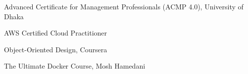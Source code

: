%
%
%



\begin{scholarship}

        {Advanced Certificate for Management Professionals (ACMP 4.0), University of Dhaka}

        {AWS Certified Cloud Practitioner}

        {Object-Oriented Design, Coursera}

        {The Ultimate Docker Course, Mosh Hamedani}

\end{scholarship}